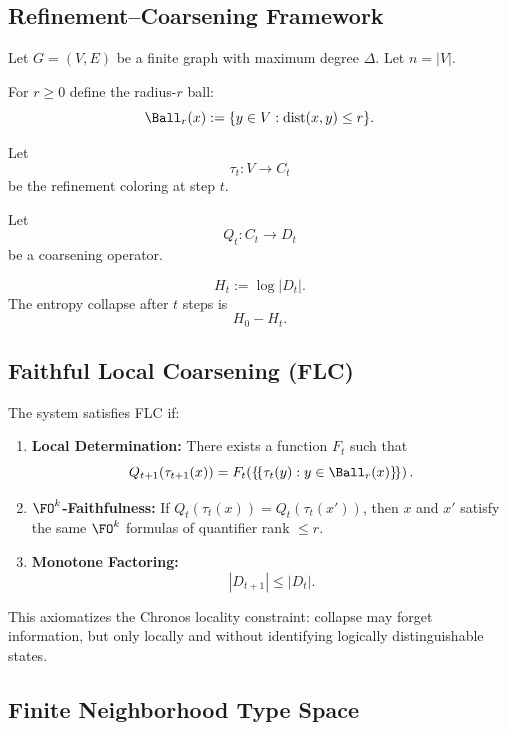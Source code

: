 \subsection{Refinement–Coarsening Framework}

Let $G=(V,E)$ be a finite graph with maximum degree $\Delta$.
Let $n = |V|$.

For $r \ge 0$ define the radius-$r$ ball:
\[
\Ball_r(x) := \{ y \in V : \operatorname{dist}(x,y) \le r \}.
\]

Let
\[
\tau_t : V \to C_t
\]
be the refinement coloring at step $t$.

Let
\[
Q_t : C_t \to D_t
\]
be a coarsening operator.

\begin{definition}
\[
H_t := \log |D_t|.
\]
The entropy collapse after $t$ steps is
\[
H_0 - H_t.
\]
\end{definition}

\subsection{Faithful Local Coarsening (FLC)}

\begin{definition}
The system satisfies FLC if:

\begin{enumerate}
\item \textbf{Local Determination:}
There exists a function $F_t$ such that
\[
Q_{t+1}(\tau_{t+1}(x))
=
F_t\!\left(\{\!\{\tau_t(y) : y \in \Ball_r(x)\}\!\}\right).
\]

\item \textbf{$\FO^k$-Faithfulness:}
If $Q_t(\tau_t(x)) = Q_t(\tau_t(x'))$,
then $x$ and $x'$ satisfy the same $\FO^k$
formulas of quantifier rank $\le r$.

\item \textbf{Monotone Factoring:}
\[
|D_{t+1}| \le |D_t|.
\]
\end{enumerate}
\end{definition}

This axiomatizes the Chronos locality constraint:
collapse may forget information,
but only locally and without identifying logically distinguishable states.

\subsection{Finite Neighborhood Type Space}

